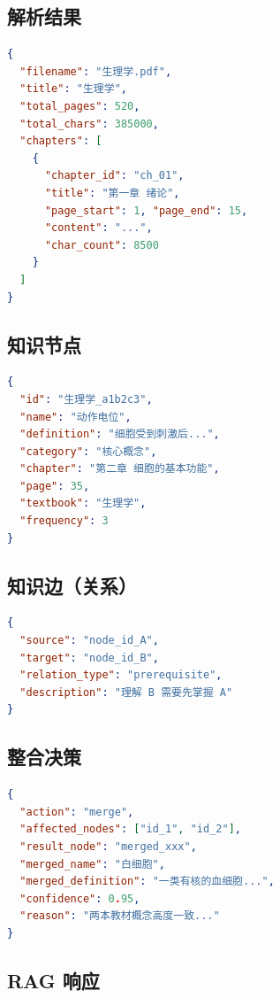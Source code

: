 \documentclass[12pt,a4paper]{article}
\begin{document}
\subsection{解析结果}

\begin{lstlisting}[language=JSON, title={Textbook 解析结果}]
{
  "filename": "生理学.pdf",
  "title": "生理学",
  "total_pages": 520,
  "total_chars": 385000,
  "chapters": [
    {
      "chapter_id": "ch_01",
      "title": "第一章 绪论",
      "page_start": 1, "page_end": 15,
      "content": "...",
      "char_count": 8500
    }
  ]
}
\end{lstlisting}

\subsection{知识节点}

\begin{lstlisting}[language=JSON, title={Knowledge Node}]
{
  "id": "生理学_a1b2c3",
  "name": "动作电位",
  "definition": "细胞受到刺激后...",
  "category": "核心概念",
  "chapter": "第二章 细胞的基本功能",
  "page": 35,
  "textbook": "生理学",
  "frequency": 3
}
\end{lstlisting}

\subsection{知识边（关系）}

\begin{lstlisting}[language=JSON, title={Knowledge Edge}]
{
  "source": "node_id_A",
  "target": "node_id_B",
  "relation_type": "prerequisite",
  "description": "理解 B 需要先掌握 A"
}
\end{lstlisting}

\subsection{整合决策}

\begin{lstlisting}[language=JSON, title={Integration Decision}]
{
  "action": "merge",
  "affected_nodes": ["id_1", "id_2"],
  "result_node": "merged_xxx",
  "merged_name": "白细胞",
  "merged_definition": "一类有核的血细胞...",
  "confidence": 0.95,
  "reason": "两本教材概念高度一致..."
}
\end{lstlisting}

\subsection{RAG 响应}
\end{document}
